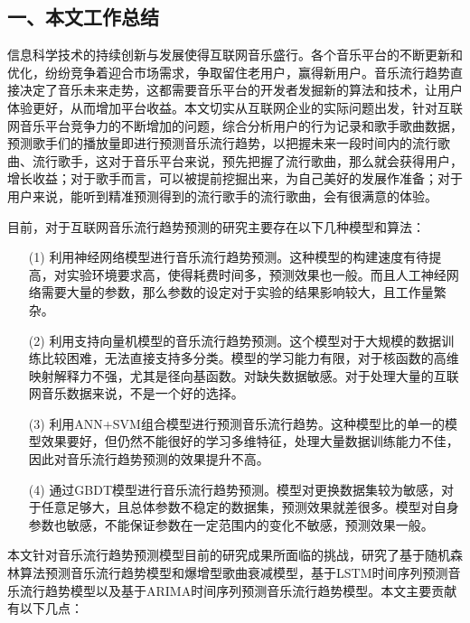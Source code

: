 \begin{conclusions}
\section*{一、本文工作总结}
信息科学技术的持续创新与发展使得互联网音乐盛行。各个音乐平台的不断更新和优化，纷纷竞争着迎合市场需求，争取留住老用户，赢得新用户。音乐流行趋势直接决定了音乐未来走势，这都需要音乐平台的开发者发掘新的算法和技术，让用户体验更好，从而增加平台收益。本文切实从互联网企业的实际问题出发，针对互联网音乐平台竞争力的不断增加的问题，综合分析用户的行为记录和歌手歌曲数据，预测歌手们的播放量即进行预测音乐流行趋势，以把握未来一段时间内的流行歌曲、流行歌手，这对于音乐平台来说，预先把握了流行歌曲，那么就会获得用户，增长收益；对于歌手而言，可以被提前挖掘出来，为自己美好的发展作准备；对于用户来说，能听到精准预测得到的流行歌手的流行歌曲，会有很满意的体验。

目前，对于互联网音乐流行趋势预测的研究主要存在以下几种模型和算法：
\begin{itemize}
    \item[(1)] {利用神经网络模型进行音乐流行趋势预测。这种模型的构建速度有待提高，对实验环境要求高，使得耗费时间多，预测效果也一般。而且人工神经网络需要大量的参数，那么参数的设定对于实验的结果影响较大，且工作量繁杂。}
    \item[(2)] {利用支持向量机模型的音乐流行趋势预测。这个模型对于大规模的数据训练比较困难，无法直接支持多分类。模型的学习能力有限，对于核函数的高维映射解释力不强，尤其是径向基函数。对缺失数据敏感。对于处理大量的互联网音乐数据来说，不是一个好的选择。}
    \item[(3)] {利用ANN+SVM组合模型进行预测音乐流行趋势。这种模型比的单一的模型效果要好，但仍然不能很好的学习多维特征，处理大量数据训练能力不佳，因此对音乐流行趋势预测的效果提升不高。}
    \item[(4)] {通过GBDT模型进行音乐流行趋势预测。模型对更换数据集较为敏感，对于任意足够大，且总体参数不稳定的数据集，预测效果就差很多。模型对自身参数也敏感，不能保证参数在一定范围内的变化不敏感，预测效果一般。}
\end{itemize}

本文针对音乐流行趋势预测模型目前的研究成果所面临的挑战，研究了基于随机森林算法预测音乐流行趋势模型和爆增型歌曲衰减模型，基于LSTM时间序列预测音乐流行趋势模型以及基于ARIMA时间序列预测音乐流行趋势模型。本文主要贡献有以下几点：


\end{conclusions}
